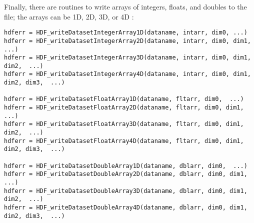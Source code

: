 \documentclass[DIV=calc, paper=letter, fontsize=11pt]{scrartcl}	 %
\begin{document}
Finally, there are routines to write arrays of integers, floats, and doubles to the file; the arrays
can be 1D, 2D, 3D, or 4D :
\begin{verbatim}
hdferr = HDF_writeDatasetIntegerArray1D(dataname, intarr, dim0, ...)
hdferr = HDF_writeDatasetIntegerArray2D(dataname, intarr, dim0, dim1,  ...)
hdferr = HDF_writeDatasetIntegerArray3D(dataname, intarr, dim0, dim1, dim2,  ...)
hdferr = HDF_writeDatasetIntegerArray4D(dataname, intarr, dim0, dim1, dim2, dim3,  ...)

hdferr = HDF_writeDatasetFloatArray1D(dataname, fltarr, dim0,  ...)
hdferr = HDF_writeDatasetFloatArray2D(dataname, fltarr, dim0, dim1,  ...)
hdferr = HDF_writeDatasetFloatArray3D(dataname, fltarr, dim0, dim1, dim2,  ...)
hdferr = HDF_writeDatasetFloatArray4D(dataname, fltarr, dim0, dim1, dim2, dim3,  ...)

hdferr = HDF_writeDatasetDoubleArray1D(dataname, dblarr, dim0,  ...)
hdferr = HDF_writeDatasetDoubleArray2D(dataname, dblarr, dim0, dim1,  ...)
hdferr = HDF_writeDatasetDoubleArray3D(dataname, dblarr, dim0, dim1, dim2,  ...)
hdferr = HDF_writeDatasetDoubleArray4D(dataname, dblarr, dim0, dim1, dim2, dim3,  ...)
\end{verbatim}
\end{document}
